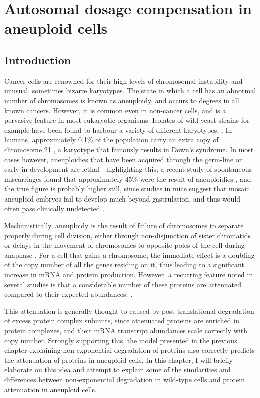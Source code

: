 \documentclass[a4paper,11pt,twoside,openright]{scrbook}
\begin{document}
\chapter{Autosomal dosage compensation in aneuploid cells}\label{chapter:aneuploidy}

\section{Introduction}

Cancer cells are renowned for their high levels of chromosomal instability and unusual, sometimes bizarre karyotypes. The state in which a cell has an abnormal number of chromosomes is known as aneuploidy, and occurs to degrees in all known cancers. However, it is common even in non-cancer cells, and is a pervasive feature in most eukaryotic organisms. Isolates of wild yeast strains for example have been found to harbour a variety of different karyotypes, \cite{Hose2015}. In humans, approximately 0.1\% of the population carry an extra copy of chromosome 21 \cite{Presson2013}, a karyotype that famously results in Down's syndrome. In most cases however, aneuploidies that have been acquired through the germ-line or early in development are lethal - highlighting this, a recent study of spontaneous miscarriages found that approximately 45\% were the result of aneuploidies \cite{Jia2015}, and the true figure is probably higher still, since studies in mice suggest that mosaic aneuploid embryos fail to develop much beyond gastrulation, and thus would often pass clinically undetected \cite{Lightfoot2006}.

Mechanistically, aneuploidy is the result of failure of chromosomes to separate properly during cell division, either through non-disjunction of sister chromatids or delays in the movement of chromosomes to opposite poles of the cell during anaphase \cite{Compton2011}. For a cell that gains a chromosome, the immediate effect is a doubling of the copy number of all the genes residing on it, thus leading to a significant increase in mRNA and protein production. However, a recurring feature noted in several studies is that a considerable number of these proteins are attenuated compared to their expected abundances. \cite{Stingele2012,Dephoure2014,Goncalves2017}.

This attenuation is generally thought to caused by post-translational degradation of excess protein complex subunits, since attenuated proteins are enriched in protein complexes, and their mRNA transcript abundances scale correctly with copy number. Strongly supporting this, the model presented in the previous chapter explaining non-exponential degradation of proteins also correctly predicts the attenuation of proteins in aneuploid cells. In this chapter, I will briefly elaborate on this idea and attempt to explain some of the similarities and differences between non-exponential degradation in wild-type cells and protein attenuation in aneuploid cells.
\end{document}

